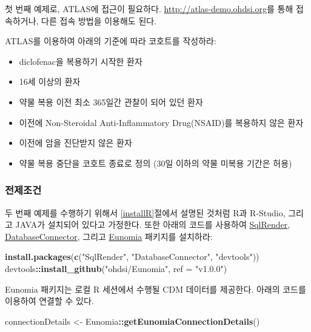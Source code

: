 \documentclass[10.5pt]{book}
\newenvironment{Shaded}{\begin{snugshade}}{\end{snugshade}}
\newcommand{\KeywordTok}[1]{\textcolor[rgb]{0.13,0.29,0.53}{\textbf{#1}}}
\newcommand{\DataTypeTok}[1]{\textcolor[rgb]{0.13,0.29,0.53}{#1}}
\newcommand{\StringTok}[1]{\textcolor[rgb]{0.31,0.60,0.02}{#1}}
\newcommand{\OperatorTok}[1]{\textcolor[rgb]{0.81,0.36,0.00}{\textbf{#1}}}
\newcommand{\NormalTok}[1]{#1}
\providecommand{\tightlist}{%
  \setlength{\itemsep}{0pt}\setlength{\parskip}{0pt}}
\theoremstyle{definition}
\theoremstyle{definition}
\theoremstyle{definition}
\theoremstyle{remark}
\let\BeginKnitrBlock\begin \let\EndKnitrBlock\end
\begin{document}
첫 번째 예제로, ATLAS에 접근이 필요하다.
\url{http://atlas-demo.ohdsi.org}를 통해 접속하거나, 다른 접속 방법을
이용해도 된다.

\BeginKnitrBlock{exercise}
\protect\hypertarget{exr:exerciseCohortsAtlas}{}{\label{exr:exerciseCohortsAtlas}
}ATLAS를 이용하여 아래의 기준에 따라 코호트를 작성하라:

\begin{itemize}
\tightlist
\item
  diclofenac을 복용하기 시작한 환자
\item
  16세 이상의 환자
\item
  약물 복용 이전 최소 365일간 관찰이 되어 있던 환자
\item
  이전에 Non-Steroidal Anti-Inflammatory Drug(NSAID)를 복용하지 않은
  환자
\item
  이전에 암을 진단받지 않은 환자
\item
  약물 복용 중단을 코호트 종료로 정의 (30일 이하의 약물 미복용 기간은
  허용)
\end{itemize}
\EndKnitrBlock{exercise}

\subsubsection*{전제조건}\label{-3}

두 번째 예제를 수행하기 위해서 \ref{installR}절에서 설명된 것처럼 R과
R-Studio, 그리고 JAVA가 설치되어 있다고 가정한다. 또한 아래의 코드를
사용하여 \href{https://ohdsi.github.io/SqlRender/}{SqlRender},
\href{https://ohdsi.github.io/DatabaseConnector/}{DatabaseConnector},
그리고 \href{https://ohdsi.github.io/Eunomia/}{Eunomia} 패키지를
설치하라:

\begin{Shaded}
\begin{Highlighting}[]
\KeywordTok{install.packages}\NormalTok{(}\KeywordTok{c}\NormalTok{(}\StringTok{"SqlRender"}\NormalTok{, }\StringTok{"DatabaseConnector"}\NormalTok{, }\StringTok{"devtools"}\NormalTok{))}
\NormalTok{devtools}\OperatorTok{::}\KeywordTok{install_github}\NormalTok{(}\StringTok{"ohdsi/Eunomia"}\NormalTok{, }\DataTypeTok{ref =} \StringTok{"v1.0.0"}\NormalTok{)}
\end{Highlighting}
\end{Shaded}

Eunomia 패키지는 로컬 R 세션에서 수행될 CDM 데이터를 제공한다. 아래의
코드를 이용하여 연결할 수 있다.

\begin{Shaded}
\begin{Highlighting}[]
\NormalTok{connectionDetails <-}\StringTok{ }\NormalTok{Eunomia}\OperatorTok{::}\KeywordTok{getEunomiaConnectionDetails}\NormalTok{()}
\end{Highlighting}
\end{Shaded}
\end{document}
